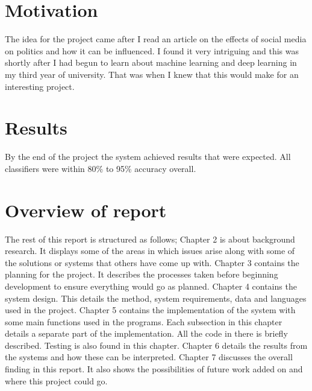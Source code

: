 \section{Motivation}
The idea for the project came after I read an article on the effects of social media on politics and how it can be influenced. I found it very intriguing and this was shortly after I had begun to learn about machine learning and deep learning in my third year of university. That was when I knew that this would make for an interesting project.

\section{Results}
By the end of the project the system achieved results that were expected. All classifiers were within 80\% to 95\% accuracy overall.

\section{Overview of report}
The rest of this report is structured as follows;
\newline
Chapter 2 is about background research. It displays some of the areas in which issues arise along with some of the solutions or systems that others have come up with. 
\newline
Chapter 3 contains the planning for the project. It describes the processes taken before beginning development to ensure everything would go as planned. 
\newline
Chapter 4 contains the system design. This details the method, system requirements, data and languages used in the project.
\newline
Chapter 5 contains the implementation of the system with some main functions used in the programs. Each subsection in this chapter details a separate part of the implementation. All the code in there is briefly described. Testing is also found in this chapter.
\newline
Chapter 6 details the results from the systems and how these can be interpreted. 
\newline
Chapter 7 discusses the overall finding in this report. It also shows the possibilities of future work added on and where this project could go.